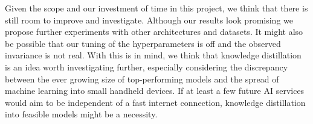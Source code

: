 \documentclass[10pt,twocolumn,letterpaper]{article}
\begin{document}
Given the scope and our investment of time in this project, we think that there is still room to improve and investigate. Although our results look promising we propose further experiments with other architectures and datasets. It might also be possible that our tuning of the hyperparameters is off and the observed invariance is not real. With this is in mind, we think that knowledge distillation is an idea worth investigating further, especially considering the discrepancy between the ever growing size of top-performing models and the spread of machine learning into small handheld devices. If at least a few future AI services would aim to be independent of a fast internet connection, knowledge distillation into feasible models might be a necessity.

{\small


}
\end{document}
